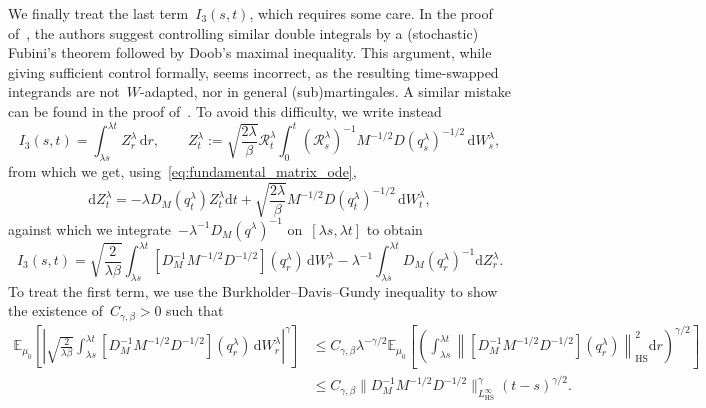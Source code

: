 \documentclass[10pt]{article}
\newcommand{\cR}{\mathcal{R}}
\renewcommand{\d}{\mathrm{d}}
\newcommand{\E}{\mathbb{E}}
\newcommand{\1}{\mathbbm 1}
\begin{document}
We finally treat the last term~$I_3(s,t)$, which requires some care. In the proof of~\cite[Lemma~3.1]{WSW24}, the authors suggest controlling similar double integrals by a (stochastic) Fubini's theorem followed by Doob's maximal inequality. This argument, while giving sufficient control formally, seems incorrect, as the resulting time-swapped integrands are not~$W$-adapted, nor in general (sub)martingales. A similar mistake can be found in the proof of~\cite[Section 3.4.2, Lemma 10]{H13}.
To avoid this difficulty, we write instead
\begin{equation}
    \label{eq:i3_rewrite}
    I_3(s,t) = \int_{\lambda s}^{\lambda t}Z_r^\lambda\,\d r,\qquad Z_t^\lambda := \sqrt{\frac{2\lambda}{\beta}}\cR_t^\lambda \int_0^t \left(\cR_s^\lambda\right)^{-1}M^{-1/2}D(q_s^\lambda)^{-1/2}\,\d W^\lambda_s,
\end{equation}
from which we get, using~\eqref{eq:fundamental_matrix_ode},
\begin{equation}
    \label{eq:Z_sde}
    \d Z_t^\lambda = -\lambda D_M(q_t^\lambda)Z_t^\lambda\d t + \sqrt{\frac{2\lambda}{\beta}}M^{-1/2}D(q_t^\lambda)^{-1/2}\,\d W_t^\lambda,
\end{equation}
against which we integrate~$-\lambda^{-1}D_M(q^\lambda)^{-1}$ on~$[\lambda s,\lambda t]$ to obtain
\begin{equation}
    \label{eq:I3_ito_decomposition}
    I_3(s,t) = \sqrt{\frac{2}{\lambda \beta}}\int_{\lambda s}^{\lambda t}\left[D_M^{-1}M^{-1/2}D^{-1/2}\right](q_r^\lambda)\,\d W^\lambda_r-\lambda^{-1}\int_{\lambda s}^{\lambda t}D_M(q_r^\lambda)^{-1}\d Z_r^\lambda.
\end{equation}
To treat the first term, we use the Burkholder--Davis--Gundy inequality to show the existence of~$C_{\gamma,\beta}>0$ such that
\begin{equation}
    \begin{aligned}
        \label{eq:I3_martingale_term}
        \E_{\mu_0}\left[\left|\sqrt{\frac{2}{\lambda\beta}}\int_{\lambda s}^{\lambda t}\left[D_M^{-1}M^{-1/2}D^{-1/2}\right](q_r^\lambda)\,\d W_r^\lambda\right|^\gamma\right] &\leq C_{\gamma,\beta}\lambda^{-\gamma/2} \E_{\mu_0}\left[\left(\int_{\lambda s}^{\lambda t}\left\|\left[D_M^{-1}M^{-1/2}D^{-1/2}\right](q_r^\lambda)\right\|^2_{\mathrm{HS}}\d r\right)^{\gamma/2}\right]\\
        &\leq C_{\gamma,\beta}\|D_M^{-1}M^{-1/2}D^{-1/2}\|_{L^\infty_{\mathrm{HS}}}^{\gamma}(t-s)^{\gamma/2}.
    \end{aligned}
\end{equation}
\end{document}
